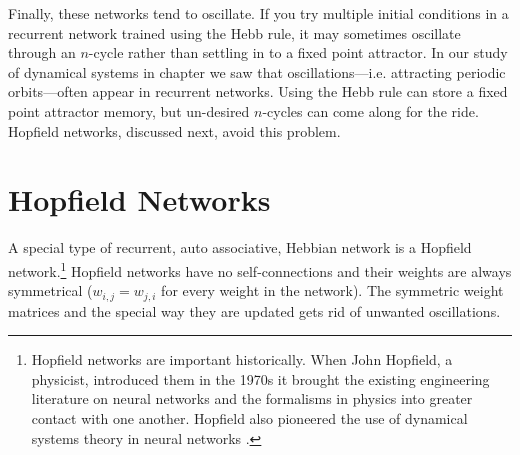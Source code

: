 Finally, these networks tend to oscillate. If you try multiple initial conditions in a recurrent network trained using the Hebb rule, it may sometimes oscillate through an $n$-cycle rather than settling in to a fixed point attractor. In our study of dynamical systems in chapter  we saw that oscillations---i.e. attracting periodic orbits---often appear in recurrent networks. Using the Hebb rule can store a fixed point attractor memory, but un-desired $n$-cycles can come along for the ride. Hopfield networks, discussed next, avoid this problem.



\section{Hopfield Networks}

A special type of recurrent, auto associative, Hebbian network is a Hopfield network.\footnote{Hopfield networks are important historically. When John Hopfield, a physicist, introduced them in the 1970s it brought the existing engineering literature on neural networks and the formalisms in physics into greater contact with one another. Hopfield also pioneered the use of dynamical systems theory in neural networks \cite{hopfield1982neural}.}  Hopfield networks have no self-connections and their weights are always symmetrical ($w_{i,j} = w_{j,i}$ for every weight in the network). The symmetric weight matrices and the special way they are updated gets rid of unwanted oscillations.


